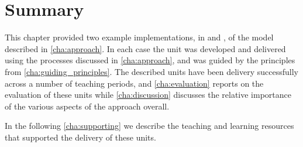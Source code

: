 

\section{Summary} %
\label{sec:ca_intro_summary}

This chapter provided two example implementations, in  and , of the model described in \cref{cha:approach}. In each case the unit was developed and delivered using the processes discussed in \cref{cha:approach}, and was guided by the principles from \cref{cha:guiding_principles}. The described units have been delivery successfully across a number of teaching periods, and \cref{cha:evaluation} reports on the evaluation of these units while \cref{cha:discussion} discusses the relative importance of the various aspects of the approach overall.

In the following \cref{cha:supporting} we describe the teaching and learning resources that supported the delivery of these units.



